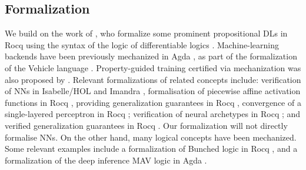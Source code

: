 \subsection{Formalization}

We build on the work of \citeauthor{affeldt2024taming}, who formalize some prominent propositional DLs in Rocq \citep{affeldt2024taming} using the syntax of the logic of differentiable logics \cite{slusarz2023logic}. Machine-learning backends have been previously mechanized in Agda \citep{agdaDL}, as part of the formalization of the Vehicle language \citep{vehicle}.  Property-guided training certified via mechanization was also proposed by \citeauthor{chevallier2022constrainedtrainingneuralnetworks} \citep{chevallier2022constrainedtrainingneuralnetworks}. Relevant formalizations of \SuAI{} related concepts include: verification of NNs in Isabelle/HOL \citep{brucker2023verifying} and Imandra \citep{desmartin2022checkinn}, formalisation of piecewise affine activation functions in Rocq \citep{aleksandrov2023formalizing}, providing generalization guarantees in Rocq \citep{bagnall2019certifying}, convergence of a single-layered perceptron in Rocq \citep{murphy2017verified}; verification of neural archetypes in Rocq \citep{DeMaria2021}; and verified generalization guarantees in Rocq \citep{bagnall2019certifying}. Our formalization will not directly formalise NNs. On the other hand, many logical concepts have been mechanized. Some relevant examples include a formalization of Bunched logic in Rocq \citep{10.1145/3497775.3503690}, and a formalization of the deep inference MAV logic in Agda \citep{Atkey2024}. 